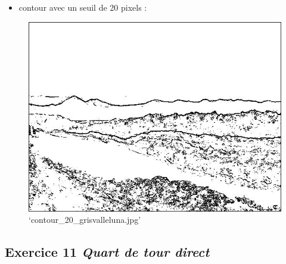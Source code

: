 \documentclass[11pt]{article}
\makeatletter
\def\maxwidth{\ifdim\Gin@nat@width>\linewidth\linewidth
    \else\Gin@nat@width\fi}
\let\Oldincludegraphics\includegraphics
\renewcommand{\includegraphics}[1]{\Oldincludegraphics[width=.8\maxwidth]{#1}}
\providecommand{\tightlist}{%
      \setlength{\itemsep}{0pt}\setlength{\parskip}{0pt}}
\makeatother
\begin{document}
\begin{itemize}
\tightlist
\item
  contour avec un seuil de 20 pixels :
\end{itemize}

\begin{figure}
\centering
\includegraphics{contour_20_grisvalleluna.jpg}
\caption{`contour\_20\_grisvalleluna.jpg'}
\end{figure}

    \hypertarget{exercice-11-quart-de-tour-direct}{%
\subsection{\texorpdfstring{Exercice 11 \emph{Quart de tour
direct}}{Exercice 11 Quart de tour direct}}\label{exercice-11-quart-de-tour-direct}}
\end{document}
